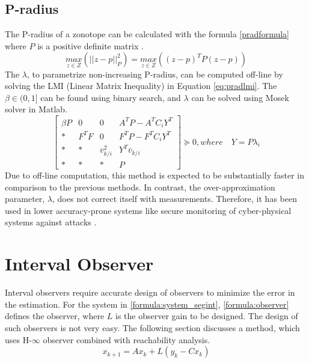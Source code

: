 \subsection{P-radius}
The P-radius of a zonotope can be calculated with the formula \eqref{pradformula} where $P$ is a positive definite matrix \cite{Alamo2005}.
\begin{equation}
\label{pradformula}
\underset{z \in Z}{max} (||z - p||^2_{P}) = \underset{z \in Z}{max}((z-p)^T P (z-p))
\end{equation}
The $\lambda$, to parametrize non-increasing P-radius, can be computed off-line by solving the LMI (Linear Matrix Inequality) in Equation \eqref{eq:pradlmi}. The $\beta \in (0,1]$ can be found using binary search, and $\lambda$ can be solved using Mosek solver in Matlab\textsuperscript{\tiny\textregistered}.
\begin{equation}
\label{eq:pradlmi}
\left[
\begin{matrix}
\beta P & 0 & 0 & A^TP - A^TC_iY^T\\
* & F^TF & 0 & F^TP -F^TC_iY^T\\
* & * & \overline{v}_{k/i}^2 & Y^T\overline{v}_{k/i}\\
* & * & * & P
\end{matrix}\right] \succeq 0,
where\quad Y = P\lambda_i
\end{equation}
Due to off-line computation, this method is expected to be substantially faster in comparison to the previous methods. In contrast, the over-approximation parameter, $\lambda$, does not correct itself with measurements. Therefore, it has been used in lower accuracy-prone systems like secure monitoring of cyber-physical systems against attacks \cite{GE20201592}. 

\section{Interval Observer}
Interval observers require accurate design of observers to minimize the error in the estimation. For the system in \eqref{formula:system_segint}, \eqref{formula:observer} defines the observer, where $L$ is the observer gain to be designed. The design of such observers is not very easy. The following section discusses a method, which uses H-$\infty$ observer combined with reachability analysis.
\begin{equation}
\label{formula:observer}
x_{k+1} = Ax_k + L(y_k -Cx_k)
\end{equation}

